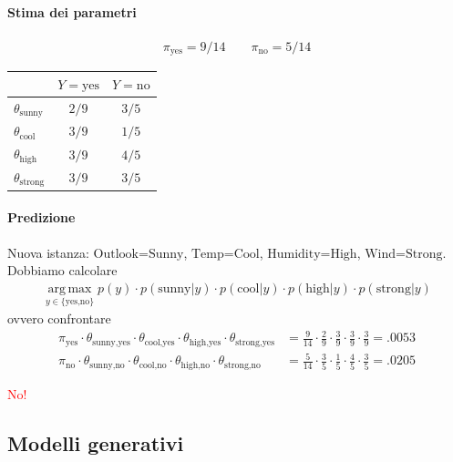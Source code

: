 \documentclass[a4paper,12pt]{article}
\newcommand{\argmax}{\operatorname*{arg\,max}}
\begin{document}
\paragraph{Stima dei parametri}
\begin{align*}
    \pi_{\text{yes}} = 9/14 \qquad \pi_{\text{no}} = 5/14
\end{align*}
\begin{center}
\begin{tabular}{lcc}
     & $Y=\text{yes}$ & $Y=\text{no}$\\
    \hline
    $\theta_{\text{sunny}}$  & $2/9$ & $3/5$\\
    $\theta_{\text{cool}}$   & $3/9$ & $1/5$\\
    $\theta_{\text{high}}$   & $3/9$ & $4/5$\\
    $\theta_{\text{strong}}$ & $3/9$ & $3/5$\\
\end{tabular}
\end{center}

\paragraph{Predizione}
Nuova istanza: $\text{Outlook=Sunny}$, $\text{Temp=Cool}$, $\text{Humidity=High}$, $\text{Wind=Strong}$.\\
Dobbiamo calcolare
\begin{align*}
    \argmax_{y\in\{\text{yes,no}\}} p(y)\cdot p(\text{sunny}|y)\cdot p(\text{cool}|y)\cdot p(\text{high}|y)\cdot p(\text{strong}|y)
\end{align*}
ovvero confrontare
\begin{align*}
    \pi_{\text{yes}}\cdot \theta_{\text{sunny,yes}}\cdot \theta_{\text{cool,yes}}\cdot \theta_{\text{high,yes}}\cdot \theta_{\text{strong,yes}} &= \tfrac{9}{14}\cdot\tfrac{2}{9}\cdot\tfrac{3}{9}\cdot\tfrac{3}{9}\cdot\tfrac{3}{9} = .0053\\
    \pi_{\text{no}}\cdot \theta_{\text{sunny,no}}\cdot \theta_{\text{cool,no}}\cdot \theta_{\text{high,no}}\cdot \theta_{\text{strong,no}} &= \tfrac{5}{14}\cdot\tfrac{3}{5}\cdot\tfrac{1}{5}\cdot\tfrac{4}{5}\cdot\tfrac{3}{5} = .0205
\end{align*}
\begin{center}
    \textcolor{red}{No!}
\end{center}
\subsection{Modelli generativi}
\end{document}
